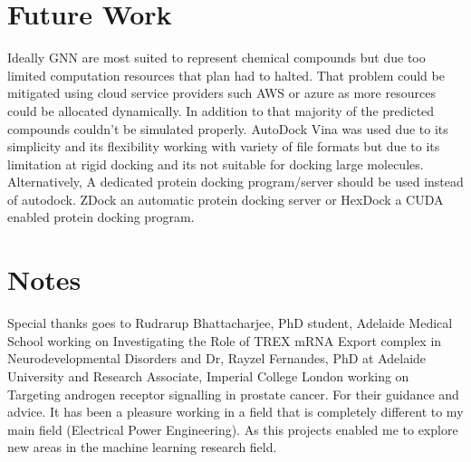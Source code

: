 \documentclass[10pt,twocolumn,letterpaper]{article}
\begin{document}
\section{Future Work}
Ideally GNN are most suited to represent chemical compounds but due too limited computation resources that plan had to halted. That problem could be mitigated using cloud service providers such AWS or azure as more resources could be allocated dynamically. In addition to that majority of the predicted compounds couldn't be simulated properly. AutoDock Vina was used due to its simplicity and its flexibility working with variety of file formats but due to its limitation at rigid docking and its not suitable for docking large molecules. Alternatively, A dedicated protein docking program/server should be used instead of autodock. ZDock an automatic protein docking server or HexDock a CUDA enabled protein docking program.  


\section{Notes}
Special thanks goes to Rudrarup Bhattacharjee,  PhD student, Adelaide Medical School working on Investigating the Role of TREX mRNA Export complex in Neurodevelopmental Disorders and  Dr, Rayzel Fernandes, PhD at Adelaide University and Research Associate, Imperial College London working on Targeting androgen receptor signalling in prostate cancer. For their guidance and advice. 
It has been a pleasure working in a field that is completely different to my main field (Electrical Power Engineering). As this projects enabled me to explore new areas in the machine learning research field.

{\small


}
\end{document}
